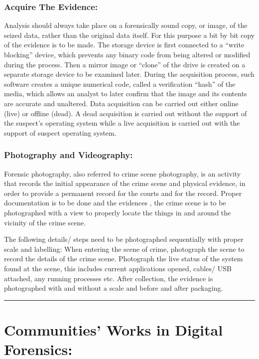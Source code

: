 \documentclass[british]{article}
\begin{document}
\subsubsection{Acquire The Evidence:}

Analysis should always take place on a forensically sound copy, or
image, of the seized data, rather than the original data itself. For
this purpose a bit by bit copy of the evidence is to be made. The
storage device is first connected to a ``write blocking'' device,
which prevents any binary code from being altered or modified during
the process. Then a mirror image or ``clone'' of the drive is created
on a separate storage device to be examined later. During the acquisition
process, such software creates a unique numerical code, called a verification
``hash'' of the media, which allows an analyst to later confirm
that the image and its contents are accurate and unaltered. Data acquisition
can be carried out either online (live) or offline (dead). A dead
acquisition is carried out without the support of the suspect's operating
system while a live acquisition is carried out with the support of
suspect operating system.

\subsubsection{Photography and Videography:}

Forensic photography, also referred to crime scene photography, is
an activity that records the initial appearance of the crime scene
and physical evidence, in order to provide a permanent record for
the courts and for the record. Proper documentation is to be done
and the evidences , the crime scene is to be photographed with a view
to properly locate the things in and around the vicinity of the crime
scene.

The following details/ steps need to be photographed sequentially
with proper scale and labelling: When entering the scene of crime,
photograph the scene to record the details of the crime scene. Photograph
the live status of the system found at the scene, this includes current
applications opened, cables/ USB attached, any running processes etc.
After collection, the evidence is photographed with and without a
scale and before and after packaging.

\rule[0.5ex]{0.75\columnwidth}{1pt}

\section{Communities\textquoteright{} Works in Digital Forensics:}
\end{document}

